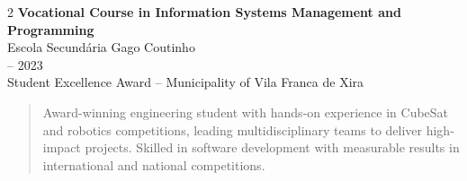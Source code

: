 \documentclass[10pt,a4paper,ragged2e,withhyper]{altacv}
\begin{document}
\begin{paracol}{2}
        \textbf{Vocational Course in Information Systems Management and Programming}\\
        \smallskip
        Escola Secundária Gago Coutinho\\
         -- 2023\\
        Student Excellence Award – Municipality of Vila Franca de Xira
            
            \divider

        
        
        
        
        
        
        \newpage
        
        \switchcolumn
        
            \begin{quote}
            Award-winning engineering student with hands-on experience in CubeSat and robotics competitions, leading multidisciplinary teams to deliver high-impact projects. Skilled in software development with measurable results in international and national competitions.
            \end{quote}


\end{paracol}
\end{document}
